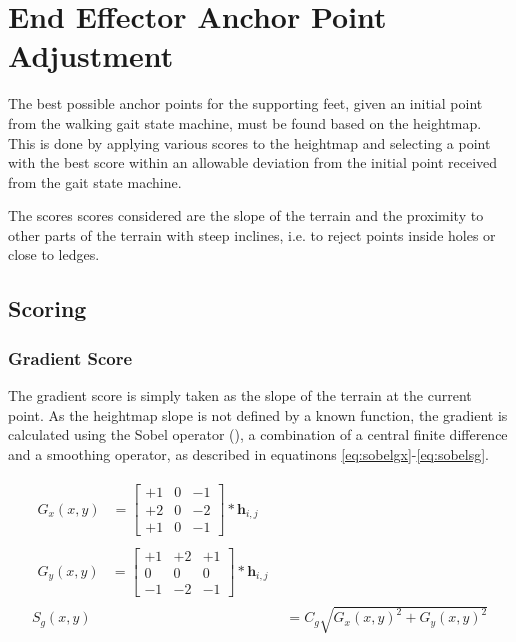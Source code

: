 \chapter{End Effector Anchor Point Adjustment} \label{chap:effector-placement}
The best possible anchor points for the supporting feet, given an initial point from the walking
gait state machine, must be found based on the heightmap. This is done by applying various
scores to the heightmap and selecting a point with the best score within an allowable
deviation from the initial point received from the gait state machine.

The scores scores considered are the slope of the terrain and the proximity to other parts of the terrain with steep inclines,
i.e. to reject points inside holes or close to ledges.


\section{Scoring}
    \subsection{Gradient Score}
        The gradient score is simply taken as the slope of the terrain at the current point. As the
        heightmap slope is not defined by a known function, the gradient is calculated using the Sobel
        operator (\cite{sobel2014}), a combination of a central finite difference and a smoothing operator, as described in equatinons \ref{eq:sobelgx}-\ref{eq:sobelsg}.

        \begin{align}
            \begin{split} \label{eq:sobelgx}
                G_x(x,y) &=  \begin{bmatrix}
                                +1 & 0 & -1\\
                                +2 & 0 & -2\\
                                +1 & 0 & -1
                            \end{bmatrix}
                            *\boldsymbol{h}_{i,j}
            \end{split}\\
            \begin{split} \label{eq:sobelgy}
                G_y(x,y) &=  \begin{bmatrix}
                                +1 & +2 & +1\\
                                0 & 0 & 0\\
                                -1 & -2 & -1
                            \end{bmatrix}
                            *\boldsymbol{h}_{i,j}
            \end{split}\\
            S_g(x,y) &= C_g\sqrt{G_x(x,y)^2 + G_y(x,y)^2} \label{eq:sobelsg}
        \end{align}

